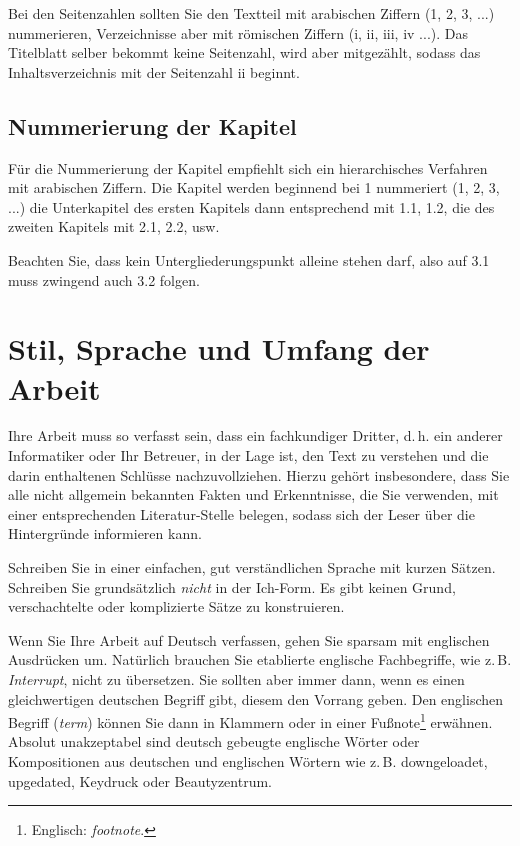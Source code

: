 \documentclass[a4paper,11pt,headings=normal]{scrartcl}
\begin{document}
Bei den Seitenzahlen sollten Sie den Textteil mit arabischen Ziffern (1, 2, 3, ...) nummerieren, Verzeichnisse aber mit römischen Ziffern (i, ii, iii, iv ...). Das Titelblatt selber bekommt keine Seitenzahl, wird aber mitgezählt, sodass das Inhaltsverzeichnis mit der Seitenzahl ii beginnt.

\subsection{Nummerierung der Kapitel}
Für die Nummerierung der Kapitel empfiehlt sich ein hierarchisches Verfahren mit arabischen Ziffern. Die Kapitel werden beginnend bei 1 nummeriert (1, 2, 3, ...) die Unterkapitel des ersten Kapitels dann entsprechend mit 1.1, 1.2, die des zweiten Kapitels mit 2.1, 2.2, usw.

Beachten Sie, dass kein Untergliederungspunkt alleine stehen darf, also auf 3.1 muss zwingend auch 3.2 folgen.

\section{Stil, Sprache und Umfang der Arbeit}
Ihre Arbeit muss so verfasst sein, dass ein fachkundiger Dritter, d.\,h. ein anderer Informatiker oder Ihr Betreuer, in der Lage ist, den Text zu verstehen und die darin enthaltenen Schlüsse nachzuvollziehen. Hierzu gehört insbesondere, dass Sie alle nicht allgemein bekannten Fakten und Erkenntnisse, die Sie verwenden, mit einer entsprechenden Literatur-Stelle belegen, sodass sich der Leser über die Hintergründe informieren kann.

Schreiben Sie in einer einfachen, gut verständlichen Sprache mit kurzen Sätzen. Schreiben Sie grundsätzlich \textit{nicht} in der Ich-Form. Es gibt keinen Grund, verschachtelte oder komplizierte Sätze zu konstruieren.

Wenn Sie Ihre Arbeit auf Deutsch verfassen, gehen Sie sparsam mit englischen Ausdrücken um. Natürlich brauchen Sie etablierte englische Fachbegriffe, wie z.\,B. \textit{Interrupt}, nicht zu übersetzen. Sie sollten aber immer dann, wenn es einen gleichwertigen deutschen Begriff gibt, diesem den Vorrang geben. Den englischen Begriff (\textit{term}) können Sie dann in Klammern oder in einer Fußnote\footnote{Englisch: \textit{footnote}.} erwähnen. Absolut unakzeptabel sind deutsch gebeugte englische Wörter oder Kompositionen aus deutschen und englischen Wörtern wie z.\,B. downgeloadet, upgedated, Keydruck oder Beautyzentrum.
\end{document}
